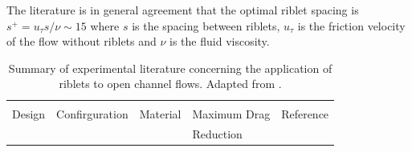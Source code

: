 \documentclass[12pt,oneside,a4paper]{article}
\begin{document}
 
 
 
  The literature is in general agreement that the optimal riblet spacing is $s^+ =  u_\tau s/\nu \sim 15$ where $s$ is the spacing between riblets, $u_\tau$ is the friction velocity of the flow without riblets and $\nu$ is the fluid viscosity.

\begin{table}[!t]
\scriptsize
\centering
\caption{Summary of experimental literature concerning the application of riblets to open channel flows. Adapted from \cite{bixler2013review}.}
\label{table:OpenChannelRiblet}
\begin{tabular}{|l|l|l|c|l|}
\hline
& & & & \\
\small Design                                                          & \small Confirguration                                            & \small Material                                              &  \multicolumn{1}{|l|}{\small Maximum Drag} &\small  Reference \\
& & & \multicolumn{1}{|l|}{\small Reduction} & \\
\hline


\end{tabular}
\end{table}
\end{document}
